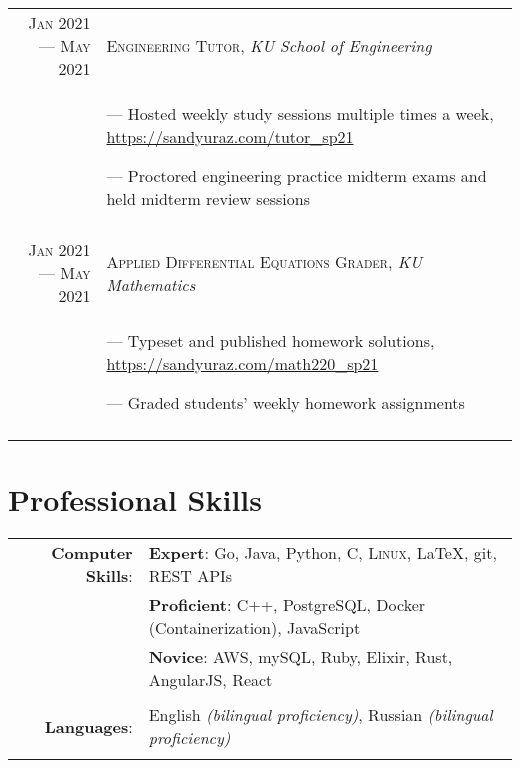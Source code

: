 \documentclass[a4paper, 10pt]{article}
\begin{document}
\begin{tabular}{r|p{12cm}}
	\textsc{Jan 2021 --- May 2021} & \textsc{Engineering Tutor}, \emph{KU School of Engineering}           \\&\footnotesize{
		--- Hosted weekly study sessions multiple times a week, \url{https://sandyuraz.com/tutor_sp21}

		--- Proctored engineering practice midterm exams and held midterm review sessions
	}                                                                                                      \\\multicolumn{2}{c}{}\\

	\textsc{Jan 2021 --- May 2021} & \textsc{Applied Differential Equations Grader}, \emph{KU Mathematics} \\&\footnotesize{
		--- Typeset and published homework solutions, \url{https://sandyuraz.com/math220_sp21}

		--- Graded students' weekly homework assignments
	}                                                                                                      \\\multicolumn{2}{c}{}\\
\end{tabular}

\section{Professional Skills}

\begin{tabular}{rl}
	\textbf{Computer Skills}: &
	\textbf{Expert}: Go, Java, Python, C, \textsc{Linux}, \LaTeX, git, REST APIs                               \\&
	\textbf{Proficient}: C++, PostgreSQL, Docker (Containerization), JavaScript                                \\&
	\textbf{Novice}: AWS, mySQL, Ruby, Elixir, Rust, AngularJS, React                                          \\\\
	\textbf{Languages}:       & English \emph{(bilingual proficiency)}, Russian \emph{(bilingual proficiency)} \\\\
\end{tabular}
\end{document}
